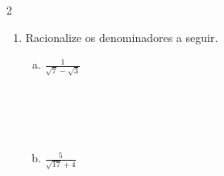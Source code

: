 \documentclass[a4paper,14pt]{article}
\begin{document}
\begin{multicols}{2}
\begin{enumerate}
\begin{enumerate}[a)]
            	\item $\frac{7}{\sqrt{7}}$\\\\\\\\\\
            	\item $-\frac{8}{\sqrt{14}}$\\\\\\\\\\
            	\item $-\frac{1}{\sqrt[3]{4}}$\\\\\\\\\\
            	\item $\frac{4}{\sqrt[3]{5}}$\\\\\\\\\\
            	\item $\frac{1}{\sqrt[7]{2^5}}$\\\\\\\\\\
            	\item $-\frac{6}{\sqrt[12]{5^9}}$\\\\\\\\\\
            	\item $\frac{14}{\sqrt[7]{7^5}}$\\\\\\\\\\
            \end{enumerate}
            \item Racionalize os denominadores a seguir.
            \begin{enumerate}[a)]
                \item $\frac{1}{\sqrt{7}-\sqrt{3}}$\\\\\\\\\\
                \item $\frac{5}{\sqrt{17} + 4}$\\\\\\\\\\

\end{enumerate}
\end{enumerate}
\end{multicols}
\end{document}
